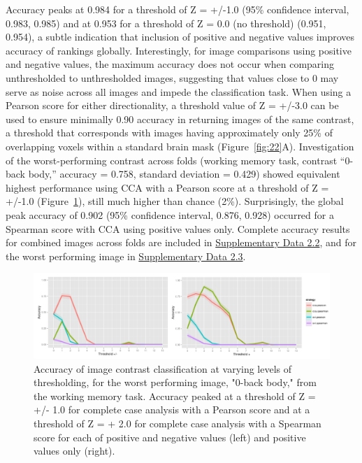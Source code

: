 \documentclass{report}
\begin{document}
Accuracy peaks at 0.984 for a threshold of Z = +/-1.0 (95\% confidence
interval, 0.983, 0.985) and at 0.953 for a threshold of Z = 0.0 (no
threshold) (0.951, 0.954), a subtle indication that inclusion of
positive and negative values improves accuracy of rankings globally.
Interestingly, for image comparisons using positive and negative values,
the maximum accuracy does not occur when comparing unthresholded to
unthresholded images, suggesting that values close to 0 may serve as
noise across all images and impede the classification task. When using a
Pearson score for either directionality, a threshold value of Z = +/-3.0
can be used to ensure minimally 0.90 accuracy in returning images of the
same contrast, a threshold that corresponds with images having
approximately only 25\% of overlapping voxels within a standard brain
mask (Figure~\ref{fig:22}A). Investigation of the worst-performing contrast across
folds (working memory task, contrast ``0-back body,'' accuracy = 0.758,
standard deviation = 0.429) showed equivalent highest performance using
CCA with a Pearson score at a threshold of Z = +/-1.0 (Figure~\ref{fig:24}), still
much higher than chance (2\%). Surprisingly, the global peak accuracy of
0.902 (95\% confidence interval, 0.876, 0.928) occurred for a Spearman
score with CCA using positive values only. Complete accuracy results for
combined images across folds are included in \href{https://github.com/vsoch/thesis/blob/master/supplementary/chapter2/supp_data2_ml_accuracy.csv}{Supplementary Data 2.2}, and
for the worst performing image in \href{https://github.com/vsoch/thesis/blob/master/supplementary/chapter2/supp_data3_ml_accuracy_TASK07_CON35.csv}{Supplementary Data 2.3}.

\begin{figure}[h!]
\begin{center}
\includegraphics[width=15cm]{images/figure24.png}
\end{center}
 \caption{\label{fig:24} Accuracy of image contrast classification at varying levels of thresholding, for the worst performing image, "0-back body," from the working memory task. Accuracy peaked at a threshold of Z = +/- 1.0 for complete case analysis with a Pearson score and at a threshold of Z = + 2.0 for complete case analysis with a Spearman score for each of positive and negative values (left) and positive values only (right).}
\end{figure}
\end{document}
